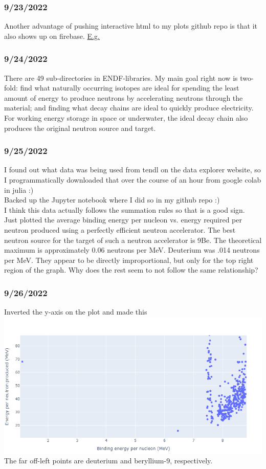 \documentclass[12pt]{article}
\begin{document}
\subsubsection{9/23/2022}
Another advantage of pushing interactive html to my plots github repo is that it also shows up on firebase.  \href{https://mp7635plots.web.app/avg_b_energy_vs_half_life.html}{E.g.}
\subsubsection{9/24/2022}
There are 49 sub-directories in ENDF-libraries. My main goal right now is two-fold: find what naturally occurring isotopes are ideal for spending the least amount of energy to produce neutrons by accelerating neutrons through the material; and finding what decay chains are ideal to quickly produce electricity. For working energy storage in space or underwater, the ideal decay chain also produces the original neutron source and target.
\subsubsection{9/25/2022}
I found out what data was being used from tendl on the data explorer website, so I programmatically downloaded that over the course of an hour from google colab in julia :) \\
Backed up the Jupyter notebook where I did so in my github repo :)\\
I think this data actually follows the summation rules so that is a good sign.\\
Just plotted the average binding energy per nucleon vs. energy required per neutron produced using a perfectly efficient neutron accelerator. The best neutron source for the target of such a neutron accelerator is 9Be. The theoretical maximum is approximately 0.06 neutrons per MeV. Deuterium was .014 neutrons per MeV. They appear to be directly improportional, but only for the top right region of the graph. Why does the rest seem to not follow the same relationship? 
\subsubsection{9/26/2022}
Inverted the y-axis on the plot and made this\\
\includegraphics[scale=.4]{Images/binding_energy_vs_energy_per_neutron.png}\\
The far off-left points are deuterium and beryllium-9, respectively. 
\end{document}
